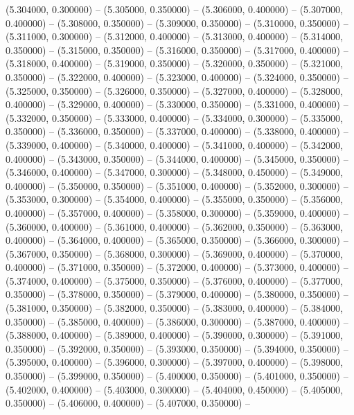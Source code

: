 (5.304000, 0.300000) -- 
(5.305000, 0.350000) -- 
(5.306000, 0.400000) -- 
(5.307000, 0.400000) -- 
(5.308000, 0.350000) -- 
(5.309000, 0.350000) -- 
(5.310000, 0.350000) -- 
(5.311000, 0.300000) -- 
(5.312000, 0.400000) -- 
(5.313000, 0.400000) -- 
(5.314000, 0.350000) -- 
(5.315000, 0.350000) -- 
(5.316000, 0.350000) -- 
(5.317000, 0.400000) -- 
(5.318000, 0.400000) -- 
(5.319000, 0.350000) -- 
(5.320000, 0.350000) -- 
(5.321000, 0.350000) -- 
(5.322000, 0.400000) -- 
(5.323000, 0.400000) -- 
(5.324000, 0.350000) -- 
(5.325000, 0.350000) -- 
(5.326000, 0.350000) -- 
(5.327000, 0.400000) -- 
(5.328000, 0.400000) -- 
(5.329000, 0.400000) -- 
(5.330000, 0.350000) -- 
(5.331000, 0.400000) -- 
(5.332000, 0.350000) -- 
(5.333000, 0.400000) -- 
(5.334000, 0.300000) -- 
(5.335000, 0.350000) -- 
(5.336000, 0.350000) -- 
(5.337000, 0.400000) -- 
(5.338000, 0.400000) -- 
(5.339000, 0.400000) -- 
(5.340000, 0.400000) -- 
(5.341000, 0.400000) -- 
(5.342000, 0.400000) -- 
(5.343000, 0.350000) -- 
(5.344000, 0.400000) -- 
(5.345000, 0.350000) -- 
(5.346000, 0.400000) -- 
(5.347000, 0.300000) -- 
(5.348000, 0.450000) -- 
(5.349000, 0.400000) -- 
(5.350000, 0.350000) -- 
(5.351000, 0.400000) -- 
(5.352000, 0.300000) -- 
(5.353000, 0.300000) -- 
(5.354000, 0.400000) -- 
(5.355000, 0.350000) -- 
(5.356000, 0.400000) -- 
(5.357000, 0.400000) -- 
(5.358000, 0.300000) -- 
(5.359000, 0.400000) -- 
(5.360000, 0.400000) -- 
(5.361000, 0.400000) -- 
(5.362000, 0.350000) -- 
(5.363000, 0.400000) -- 
(5.364000, 0.400000) -- 
(5.365000, 0.350000) -- 
(5.366000, 0.300000) -- 
(5.367000, 0.350000) -- 
(5.368000, 0.300000) -- 
(5.369000, 0.400000) -- 
(5.370000, 0.400000) -- 
(5.371000, 0.350000) -- 
(5.372000, 0.400000) -- 
(5.373000, 0.400000) -- 
(5.374000, 0.400000) -- 
(5.375000, 0.350000) -- 
(5.376000, 0.400000) -- 
(5.377000, 0.350000) -- 
(5.378000, 0.350000) -- 
(5.379000, 0.400000) -- 
(5.380000, 0.350000) -- 
(5.381000, 0.350000) -- 
(5.382000, 0.350000) -- 
(5.383000, 0.400000) -- 
(5.384000, 0.350000) -- 
(5.385000, 0.400000) -- 
(5.386000, 0.300000) -- 
(5.387000, 0.400000) -- 
(5.388000, 0.400000) -- 
(5.389000, 0.400000) -- 
(5.390000, 0.300000) -- 
(5.391000, 0.350000) -- 
(5.392000, 0.350000) -- 
(5.393000, 0.350000) -- 
(5.394000, 0.350000) -- 
(5.395000, 0.400000) -- 
(5.396000, 0.300000) -- 
(5.397000, 0.400000) -- 
(5.398000, 0.350000) -- 
(5.399000, 0.350000) -- 
(5.400000, 0.350000) -- 
(5.401000, 0.350000) -- 
(5.402000, 0.400000) -- 
(5.403000, 0.300000) -- 
(5.404000, 0.450000) -- 
(5.405000, 0.350000) -- 
(5.406000, 0.400000) -- 
(5.407000, 0.350000) -- 
